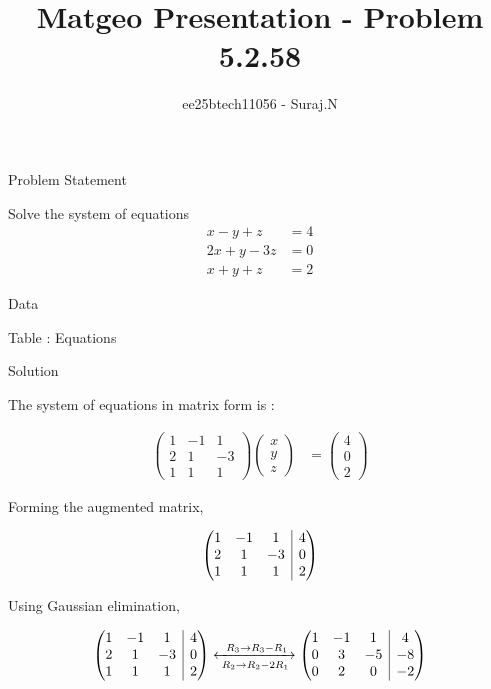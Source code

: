 \documentclass{beamer}
\title{Matgeo Presentation - Problem 5.2.58}
\author{ee25btech11056 - Suraj.N}
\makeatletter
\numberwithin{equation}{section}
\theoremstyle{remark}
\newcommand{\myvec}[1]{\ensuremath{\begin{pmatrix}#1\end{pmatrix}}}
\newenvironment{amatrix}[1]{%
  \left(\begin{array}{@{}*{#1}{c}|c@{}}
}{%
  \end{array}\right)
}
\newcommand{\myaugvec}[2]{\ensuremath{\begin{amatrix}{#1}#2\end{amatrix}}}
\makeatother
\begin{document}
\begin{frame}
  \titlepage
\end{frame}

\begin{frame}{Problem Statement}

Solve the system of equations
\[
\begin{aligned}
x - y + z &= 4\\
2x + y - 3z &= 0\\
x + y + z &= 2
\end{aligned}
\]
\end{frame}

\begin{frame}{Data}

\begin{table}[h!]
  \centering
  
  \caption*{Table : Equations}
  \label{5.2.58}
\end{table}

\end{frame}

\begin{frame}{Solution}

The system of equations in matrix form is :

\begin{align}
  \myvec{1 & -1 & 1\\2 & 1 & -3\\1 & 1 & 1}\myvec{x\\y\\z} &= \myvec{4\\0\\2}
\end{align}

Forming the augmented matrix,

\begin{align}
  \myaugvec{3}{1 & -1 & 1 & 4\\ 2 & 1 & -3 & 0\\1 & 1 & 1 & 2}
\end{align}

Using Gaussian elimination,

\begin{align}
  \myaugvec{3}{1 & -1 & 1 & 4\\ 2 & 1 & -3 & 0\\1 & 1 & 1 & 2}
  \xleftrightarrow[\;R_2 \to R_2 -2R_1\;]{\;R_3 \to R_3 - R_1}
  \myaugvec{3}{1 & -1 & 1 & 4\\0 & 3 & -5 & -8\\0 & 2 & 0 & -2}
\end{align} 

\end{frame}
\end{document}
